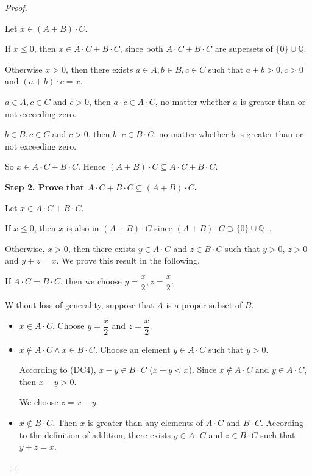 \begin{proof}
\begin{enumerate}[label={(F\arabic*)}, start=5]
              Let $x\in (A + B)\cdot C$.

              If $x\le 0$, then $x\in A\cdot C + B\cdot C$, since both $A\cdot C + B\cdot C$ are supersets of $\{0\}\cup\mathbb{Q}$.

              \bigskip

              Otherwise $x > 0$, then there exists $a\in A, b\in B, c\in C$ such that $a + b > 0, c > 0$ and $(a + b)\cdot c = x$.

              $a\in A, c\in C$ and $c > 0$, then $a\cdot c\in A\cdot C$, no matter whether $a$ is greater than or not exceeding zero.

              $b\in B, c\in C$ and $c > 0$, then $b\cdot c\in B\cdot C$, no matter whether $b$ is greater than or not exceeding zero.

              So $x\in A\cdot C + B\cdot C$. Hence $(A + B)\cdot C\subseteq A\cdot C + B\cdot C$.

              \textbf{Step 2. Prove that $A\cdot C + B\cdot C\subseteq (A + B)\cdot C$.}

              Let $x\in A\cdot C + B\cdot C$.

              If $x\le 0$, then $x$ is also in $(A + B)\cdot C$ since $(A + B)\cdot C \supset \{0\}\cup\mathbb{Q}_{-}$.

              Otherwise, $x > 0$, then there exists $y\in A\cdot C$ and $z\in B\cdot C$ such that $y > 0$, $z > 0$ and $y + z = x$. We prove this result in the following.

              If $A\cdot C = B\cdot C$, then we choose $y = \dfrac{x}{2}, z = \dfrac{x}{2}$.

              Without loss of generality, suppose that $A$ is a proper subset of $B$.

              \begin{itemize}
                  \item $x\in A\cdot C$. Choose $y = \dfrac{x}{2}$ and $z = \dfrac{x}{2}$.
                  \item $x\notin A\cdot C\land x\in B\cdot C$.
                        Choose an element $y\in A\cdot C$ such that $y > 0$.

                        According to (DC4), $x - y\in B\cdot C$ ($x - y < x$). Since $x\notin A\cdot C$ and $y\in A\cdot C$, then $x - y > 0$.

                        We choose $z = x - y$.
                  \item $x\notin B\cdot C$. Then $x$ is greater than any elements of $A\cdot C$ and $B\cdot C$. According to the definition of addition, there exists $y\in A\cdot C$ and $z\in B\cdot C$ such that $y + z = x$.


\end{itemize}
\end{enumerate}
\end{proof}
